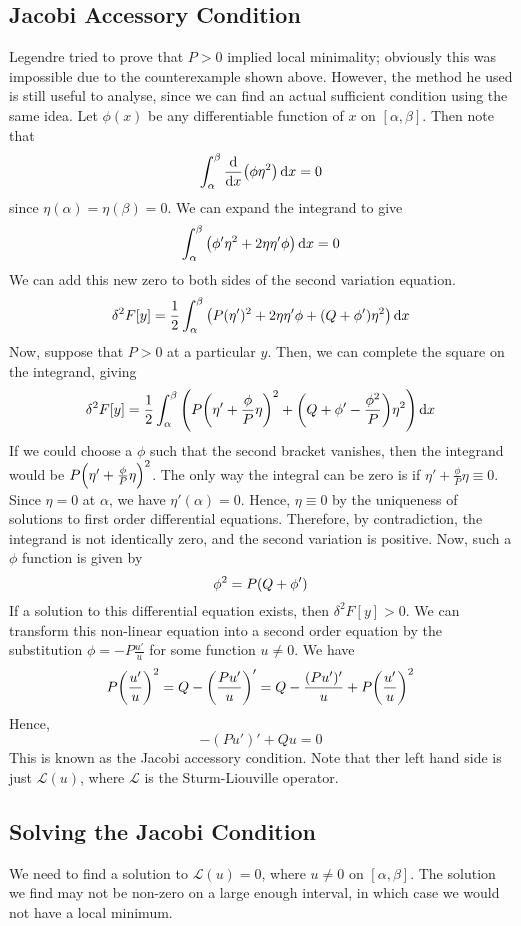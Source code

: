 \subsection{Jacobi Accessory Condition}
Legendre tried to prove that \( P > 0 \) implied local minimality; obviously this was impossible due to the counterexample shown above.
However, the method he used is still useful to analyse, since we can find an actual sufficient condition using the same idea.
Let \( \phi(x) \) be any differentiable function of \( x \) on \( [\alpha, \beta] \).
Then note that
\[
	\int_\alpha^\beta \dv{x} \qty( \phi \eta^2 ) \dd{x} = 0
\]
since \( \eta(\alpha) = \eta(\beta) = 0 \).
We can expand the integrand to give
\[
	\int_\alpha^\beta \qty( \phi' \eta^2 + 2 \eta \eta' \phi ) \dd{x} = 0
\]
We can add this new zero to both sides of the second variation equation.
\[
	\delta^2 F[y] = \frac{1}{2} \int_\alpha^\beta \qty( P(\eta')^2 + 2 \eta \eta' \phi + \qty(Q + \phi') \eta^2 ) \dd{x}
\]
Now, suppose that \( P > 0 \) at a particular \( y \).
Then, we can complete the square on the integrand, giving
\[
	\delta^2 F[y] = \frac{1}{2} \int_\alpha^\beta \qty( P\qty(\eta' + \frac{\phi}{P} \eta)^2 + \qty(Q + \phi' - \frac{\phi^2}{P}) \eta^2 ) \dd{x}
\]
If we could choose a \( \phi \) such that the second bracket vanishes, then the integrand would be \( P\qty(\eta' + \frac{\phi}{P} \eta)^2 \).
The only way the integral can be zero is if \( \eta' + \frac{\phi}{P} \eta \equiv 0 \).
Since \( \eta = 0 \) at \( \alpha \), we have \( \eta'(\alpha) = 0 \).
Hence, \( \eta \equiv 0 \) by the uniqueness of solutions to first order differential equations.
Therefore, by contradiction, the integrand is not identically zero, and the second variation is positive.
Now, such a \( \phi \) function is given by
\[
	\phi^2 = P\qty(Q + \phi')
\]
If a solution to this differential equation exists, then \( \delta^2 F[y] > 0 \).
We can transform this non-linear equation into a second order equation by the substitution \( \phi = -P \frac{u'}{u} \) for some function \( u \neq 0 \).
We have
\[
	P \qty(\frac{u'}{u})^2 = Q - \qty(\frac{Pu'}{u})' = Q - \frac{(Pu')'}{u} + P \qty(\frac{u'}{u})^2
\]
Hence,
\[
	-(Pu')' + Qu = 0
\]
This is known as the Jacobi accessory condition.
Note that ther left hand side is just \( \mathcal L(u) \), where \( \mathcal L \) is the Sturm-Liouville operator.

\subsection{Solving the Jacobi Condition}
We need to find a solution to \( \mathcal L(u) = 0 \), where \( u \neq 0 \) on \( [\alpha, \beta] \).
The solution we find may not be non-zero on a large enough interval, in which case we would not have a local minimum.


